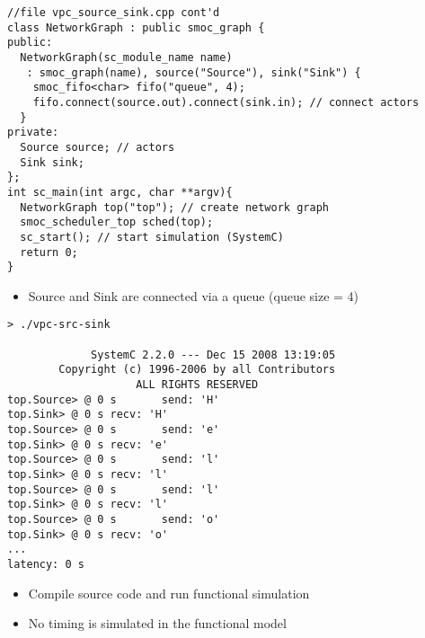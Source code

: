 \begin{frame}[fragile=singleslide]
\begin{lstlisting}
//file vpc_source_sink.cpp cont'd
class NetworkGraph : public smoc_graph {
public:
  NetworkGraph(sc_module_name name)
   : smoc_graph(name), source("Source"), sink("Sink") {
    smoc_fifo<char> fifo("queue", 4);
    fifo.connect(source.out).connect(sink.in); // connect actors
  }
private:
  Source source; // actors
  Sink sink;
};
int sc_main(int argc, char **argv){
  NetworkGraph top("top"); // create network graph
  smoc_scheduler_top sched(top);
  sc_start(); // start simulation (SystemC)
  return 0;
}
\end{lstlisting}
\begin{itemize}
\item Source and Sink are connected via a queue (queue size = 4)
\end{itemize}
\end{frame}


\begin{frame}[fragile=singleslide]
\begin{lstlisting}
> ./vpc-src-sink

             SystemC 2.2.0 --- Dec 15 2008 13:19:05
        Copyright (c) 1996-2006 by all Contributors
                    ALL RIGHTS RESERVED            
top.Source> @ 0 s       send: 'H'
top.Sink> @ 0 s recv: 'H'
top.Source> @ 0 s       send: 'e'
top.Sink> @ 0 s recv: 'e'
top.Source> @ 0 s       send: 'l'
top.Sink> @ 0 s recv: 'l'
top.Source> @ 0 s       send: 'l'
top.Sink> @ 0 s recv: 'l'
top.Source> @ 0 s       send: 'o'
top.Sink> @ 0 s recv: 'o'
...
latency: 0 s
\end{lstlisting}
\begin{itemize}
\item Compile source code and run functional simulation
\item No timing is simulated in the functional model
\end{itemize}
\end{frame}


